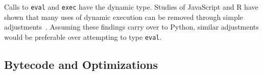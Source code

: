 \documentclass[english,cleveref,submission]{programming}
\newcommand{\SP}{Static Python}
\newcommand{\code}[1]{\texttt{#1}}
\begin{document}
Calls to \code{eval} and \code{exec} have the dynamic type.
%
Studies of JavaScript and R have shown that many uses of dynamic execution
can be removed through simple adjustments~\cite{rhbv-ecoop-2011,gdkkv-oopsla-2021,mrmv-esop-2012}.
Assuming these findings carry over to Python, similar adjustments would be
preferable over attempting to type \code{eval}.




\subsection{Bytecode and Optimizations}
\label{s:optimize}
\end{document}
